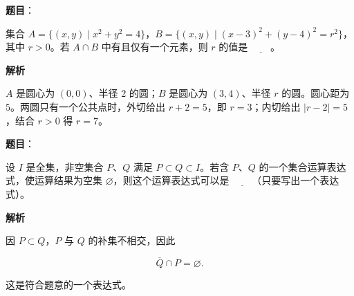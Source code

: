 \begin{answer}

\textbf{题目}：

集合 $A=\{(x,y)\mid x^2+y^2=4\}$，$B=\{(x,y)\mid (x-3)^2+(y-4)^2=r^2\}$，其中 $r>0$。若 $A\cap B$ 中有且仅有一个元素，则 $r$ 的值是 $\underline{\qquad}$。

\textbf{解析}

$A$ 是圆心为 $(0,0)$、半径 $2$ 的圆；$B$ 是圆心为 $(3,4)$、半径 $r$ 的圆。圆心距为 $5$。两圆只有一个公共点时，外切给出 $r+2=5$，即 $r=3$；内切给出 $|r-2|=5$，结合 $r>0$ 得 $r=7$。


\end{answer}
\begin{answer}

\textbf{题目}：

设 $I$ 是全集，非空集合 $P$、$Q$ 满足 $P\subset Q\subset I$。若含 $P$、$Q$ 的一个集合运算表达式，使运算结果为空集 $\varnothing$，则这个运算表达式可以是 $\underline{\qquad}$（只要写出一个表达式）。

\textbf{解析}

因 $P\subset Q$，$P$ 与 $Q$ 的补集不相交，因此

\nopagebreak[4]
\[
\overline{Q}\cap P=\varnothing.
\]

这是符合题意的一个表达式。


\end{answer}

